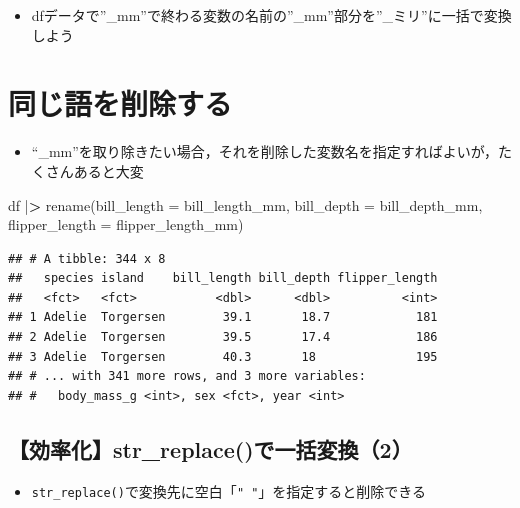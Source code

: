 \documentclass[
  xelatex,ja=standard, b5paper]{bxjsbook}
\newenvironment{Shaded}{\begin{snugshade}}{\end{snugshade}}
\newcommand{\AttributeTok}[1]{\textcolor[rgb]{0.77,0.63,0.00}{#1}}
\newcommand{\ErrorTok}[1]{\textcolor[rgb]{0.64,0.00,0.00}{\textbf{#1}}}
\newcommand{\FunctionTok}[1]{\textcolor[rgb]{0.00,0.00,0.00}{#1}}
\newcommand{\NormalTok}[1]{#1}
\newcommand{\SpecialCharTok}[1]{\textcolor[rgb]{0.00,0.00,0.00}{#1}}
\providecommand{\tightlist}{%
  \setlength{\itemsep}{0pt}\setlength{\parskip}{0pt}}
\begin{document}
\begin{itemize}
\tightlist
\item
  dfデータで''\_mm''で終わる変数の名前の''\_mm''部分を''\_ミリ''に一括で変換しよう
\end{itemize}

\hypertarget{rename-remove}{%
\section{同じ語を削除する}\label{rename-remove}}

\begin{itemize}
\tightlist
\item
  ``\_mm''を取り除きたい場合，それを削除した変数名を指定すればよいが，たくさんあると大変
\end{itemize}

\begin{Shaded}
\begin{Highlighting}[]
\NormalTok{df }\SpecialCharTok{|}\ErrorTok{\textgreater{}} 
  \FunctionTok{rename}\NormalTok{(}\AttributeTok{bill\_length =}\NormalTok{ bill\_length\_mm,}
         \AttributeTok{bill\_depth  =}\NormalTok{ bill\_depth\_mm,}
         \AttributeTok{flipper\_length =}\NormalTok{ flipper\_length\_mm)}
\end{Highlighting}
\end{Shaded}

\begin{verbatim}
## # A tibble: 344 x 8
##   species island    bill_length bill_depth flipper_length
##   <fct>   <fct>           <dbl>      <dbl>          <int>
## 1 Adelie  Torgersen        39.1       18.7            181
## 2 Adelie  Torgersen        39.5       17.4            186
## 3 Adelie  Torgersen        40.3       18              195
## # ... with 341 more rows, and 3 more variables:
## #   body_mass_g <int>, sex <fct>, year <int>
\end{verbatim}

\hypertarget{rename-strreplace2}{%
\subsection{【効率化】str\_replace()で一括変換（2）}\label{rename-strreplace2}}

\begin{itemize}
\tightlist
\item
  \texttt{str\_replace()}で変換先に空白「\texttt{"\ "}」を指定すると削除できる
\end{itemize}
\end{document}

